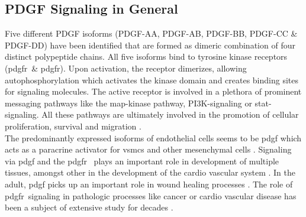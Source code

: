     \subsection{PDGF Signaling in General}
    \label{subsec:pdgf_the_cytokine}
    Five different PDGF isoforms (PDGF-AA, PDGF-AB, PDGF-BB, PDGF-CC \& PDGF-DD) have been identified that are formed as dimeric combination of four distinct polypeptide chains. All five isoforms bind to tyrosine kinase receptors (\ac{pdgfr}\alpha~\& \ac{pdgfr}\beta). Upon activation, the receptor dimerizes, allowing autophosphorylation which activates the kinase domain and creates binding sites for signaling molecules. The active receptor is involved in a plethora of prominent messaging pathways like the \ac{map}-kinase pathway, \ac{PI3K}-signaling or \ac{stat}-signaling. All these pathways are ultimately involved in the promotion of cellular proliferation, survival and migration \cite{chenPlateletderivedGrowthFactors2013, heldinTargetingPDGFSignaling2013, huTargetingPlateletderivedGrowth2015}.\\
    The predominantly expressed isoforms of endothelial cells seems to be \ac{pdgf} \cite{andraeRolePlateletderivedGrowth2008, heldinTargetingPDGFSignaling2013} which acts as a paracrine activator for \acp{vsmc} and other mesenchymal cells \cite{heldinTargetingPDGFSignaling2013}. Signaling via \ac{pdgf} and the \ac{pdgfr}\beta~ plays an important role in development of multiple tissues, amongst other in the development of the cardio vascular system \cite{leveenMiceDeficientPDGF1994}. In the adult, \ac{pdgf} picks up an important role in wound healing processes \cite{robsonPlateletderivedGrowthFactor1992}. The role of \ac{pdgfr}\beta~signaling in pathologic processes like cancer or cardio vascular disease has been a subject of extensive study for decades \cite{heldinTargetingPDGFSignaling2013, rainesPDGFCardiovascularDisease2004}.

